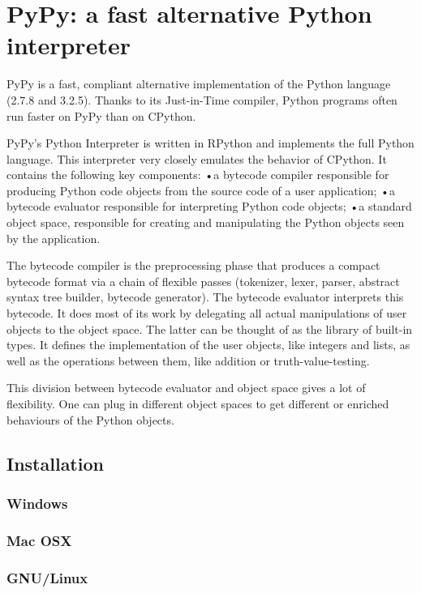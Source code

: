 \newpage
\section{PyPy: a fast alternative Python interpreter}


PyPy is a fast, compliant alternative implementation of the Python language (2.7.8 and 3.2.5). Thanks to its Just-in-Time compiler, Python programs often run faster on PyPy than on CPython.

PyPy’s Python Interpreter is written in RPython and implements the full Python language. This interpreter very closely emulates the behavior of CPython. It contains the following key components:
•a bytecode compiler responsible for producing Python code objects from the source code of a user application;
•a bytecode evaluator responsible for interpreting Python code objects;
•a standard object space, responsible for creating and manipulating the Python objects seen by the application.

The bytecode compiler is the preprocessing phase that produces a compact bytecode format via a chain of flexible passes (tokenizer, lexer, parser, abstract syntax tree builder, bytecode generator). The bytecode evaluator interprets this bytecode. It does most of its work by delegating all actual manipulations of user objects to the object space. The latter can be thought of as the library of built-in types. It defines the implementation of the user objects, like integers and lists, as well as the operations between them, like addition or truth-value-testing.

This division between bytecode evaluator and object space gives a lot of flexibility. One can plug in different object spaces to get different or enriched behaviours of the Python objects.


\subsection{Installation}

\subsubsection{Windows}

\subsubsection{Mac OSX}

\subsubsection{GNU/Linux}



